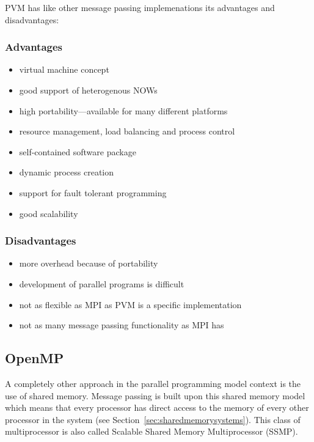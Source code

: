PVM has like other message passing implemenations its advantages and
disadvantages:

\subsubsection{Advantages}
\begin{itemize}
\item virtual machine concept
\item good support of heterogenous NOWs
\item high portability---available for many different platforms
\item resource management, load balancing and process control
\item self-contained software package
\item dynamic process creation
\item support for fault tolerant programming
\item good scalability
\end{itemize}

\subsubsection{Disadvantages}
\begin{itemize}
\item more overhead because of portability
\item development of parallel programs is difficult
\item not as flexible as MPI as PVM is a specific implementation
\item not as many message passing functionality as MPI has
\end{itemize}

\subsection{OpenMP}
\label{sec:OpenMP}

A completely other approach in the parallel programming model context
is the use of shared memory. Message passing is built upon this shared
memory model which means that every processor has direct access to the
memory of every other processor in the system
(see Section~\ref{sec:sharedmemorysystems}). This class of
multiprocessor is also called Scalable Shared Memory Multiprocessor
(SSMP).

